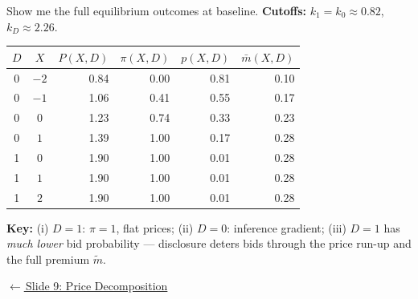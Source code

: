\documentclass[aspectratio=169,10pt]{beamer}
\newcommand{\1}{\mathbf{1}}
\newcommand{\returnlink}[2]{%
  \par\vspace{0.2em}\hfill{\scriptsize\hyperlink{#1}{\textcolor{brightblue}{$\leftarrow$\,#2}}}%
}
\begin{document}
\begin{frame}{Show me the full equilibrium outcomes at baseline.}
\hypertarget{backup:baseline_outcomes}{}
\footnotesize
\textbf{Cutoffs:} $k_1 = k_0 \approx 0.82$, $k_D \approx 2.26$.

\vspace{0.1em}

\begin{center}
\begin{tabular}{ccrrrr}
\toprule
$D$ & $X$ & $P(X,D)$ & $\pi(X,D)$ & $p(X,D)$ & $\bar{m}(X,D)$ \\
\midrule
0 & $-2$ & 0.84 & 0.00 & 0.81 & 0.10 \\
0 & $-1$ & 1.06 & 0.41 & 0.55 & 0.17 \\
0 & $0$  & 1.23 & 0.74 & 0.33 & 0.23 \\
0 & $1$  & 1.39 & 1.00 & 0.17 & 0.28 \\
\midrule
1 & $0$  & 1.90 & 1.00 & 0.01 & 0.28 \\
1 & $1$  & 1.90 & 1.00 & 0.01 & 0.28 \\
1 & $2$  & 1.90 & 1.00 & 0.01 & 0.28 \\
\bottomrule
\end{tabular}
\end{center}

\vspace{0.1em}

\textbf{Key:} (i) $D{=}1$: $\pi = 1$, flat prices; (ii) $D{=}0$: inference gradient; (iii) $D{=}1$ has \emph{much lower} bid probability --- disclosure deters bids through the price run-up and the full premium $\tilde m$.

\returnlink{main:prop3}{Slide 9: Price Decomposition}
\end{frame}
\end{document}
